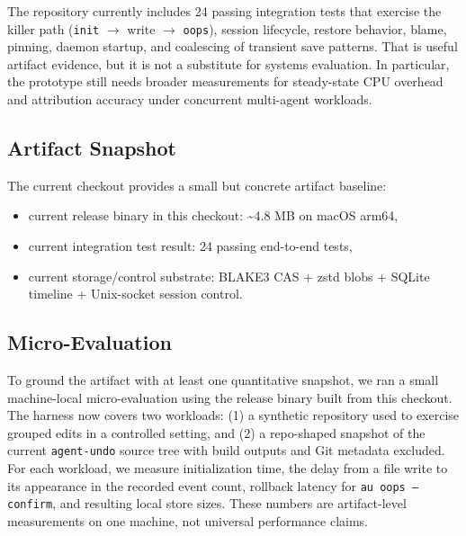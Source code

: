 \documentclass[10pt,a4paper]{article}
\begin{document}
The repository currently includes 24 passing integration tests that exercise
the killer path (\texttt{init} $\rightarrow$ write $\rightarrow$ \texttt{oops}),
session lifecycle, restore behavior, blame, pinning, daemon startup, and
coalescing of transient save patterns. That is useful artifact evidence, but it
is not a substitute for systems evaluation. In particular, the prototype still
needs broader measurements for steady-state CPU overhead and attribution
accuracy under concurrent multi-agent workloads.

\subsection{Artifact Snapshot}

The current checkout provides a small but concrete artifact baseline:

\begin{itemize}
  \item current release binary in this checkout: \textasciitilde{}4.8 MB on macOS arm64,
  \item current integration test result: 24 passing end-to-end tests,
  \item current storage/control substrate: BLAKE3 CAS + zstd blobs + SQLite timeline + Unix-socket session control.
\end{itemize}

\subsection{Micro-Evaluation}

To ground the artifact with at least one quantitative snapshot, we ran a small
machine-local micro-evaluation using the release binary built from this checkout.
The harness now covers two workloads: (1) a synthetic repository used to
exercise grouped edits in a controlled setting, and (2) a repo-shaped snapshot
of the current \texttt{agent-undo} source tree with build outputs and Git
metadata excluded. For each workload, we measure initialization time, the delay
from a file write to its appearance in the recorded event count, rollback
latency for \texttt{au oops --confirm}, and resulting local store sizes. These
numbers are artifact-level measurements on one machine, not universal
performance claims.
\end{document}
